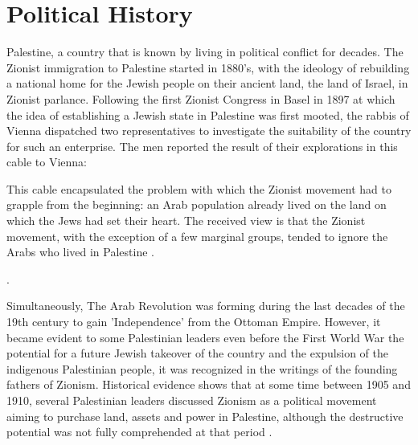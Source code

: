 
\section{Political History}
Palestine, a country that is known by living in political conflict for decades.
The Zionist immigration to Palestine started in 1880's, with the ideology of rebuilding a national home for the Jewish people on their ancient land, the land of Israel, in Zionist parlance\citep{Morris2004}\citep{Pappe2006}\citep{Khalidi2015}.
Following the first Zionist Congress in Basel in 1897 at which the idea of
establishing a Jewish state in Palestine was first mooted, the rabbis of Vienna
dispatched two representatives to investigate the suitability of the country for
such an enterprise. The men reported the result of their explorations in this cable
to Vienna:




\centerline{\textit{}}

This cable encapsulated the problem with which the Zionist movement had to grapple from the beginning: an Arab population already lived on the land on which the Jews had set their heart. The received view is that the Zionist movement, with the exception of a few marginal groups, tended to ignore the Arabs who lived in Palestine \citep{Shlaim2014}\citep{Karmi2007}.

 \cite[p.11]{Pappe2006}.


Simultaneously, The Arab Revolution was forming during the last decades of the 19th century to gain 'Independence' from the Ottoman Empire. However, it became evident to some Palestinian leaders even before the First World War the potential for a future Jewish takeover of the country and the expulsion of the indigenous Palestinian people, it was recognized in the writings of the founding fathers of Zionism. Historical evidence shows that at some time between 1905 and 1910, 
several Palestinian leaders discussed Zionism as a political movement 
aiming to purchase land, assets and power in Palestine, although the 
destructive potential was not fully comprehended at that period \citep{Pappe2006}.



